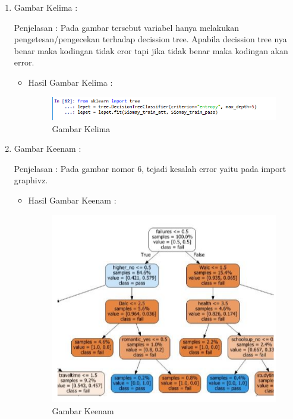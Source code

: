 \begin{itemize}
\begin{enumerate}
\begin{itemize}
\end{itemize}
\par
\item  Gambar Kelima :
\par Penjelasan : Pada gambar tersebut variabel hanya melakukan pengetesan/pengecekan terhadap decission tree. Apabila decission tree nya benar maka kodingan tidak eror tapi jika tidak benar maka kodingan akan error. 
\par 
\begin{itemize}
\par
\item Hasil  Gambar Kelima :

\begin{figure}[ht]
\centering
\includegraphics[scale=0.7]{figures/AIP/jd5.PNG}
\caption{ Gambar Kelima}
\label{5}
\end{figure}


\end{itemize}
\item  Gambar Keenam :
\par Penjelasan : Pada gambar nomor 6, tejadi kesalah error yaitu pada import graphivz.
\par 
\begin{itemize}
\par
\item Hasil  Gambar Keenam :

\begin{figure}[ht]
\centering
\includegraphics[scale=0.4]{figures/AIP/jd13.PNG}
\caption{ Gambar Keenam}
\label{13}
\end{figure}



\end{itemize}
\end{enumerate}
\end{itemize}
